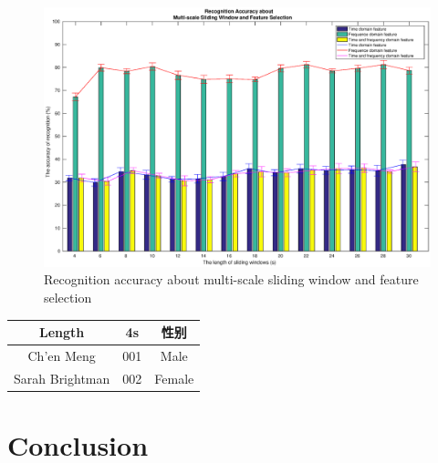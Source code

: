 \documentclass[runningheads,a4paper]{llncs}
\begin{document}
\begin{figure}
  \centering
  \includegraphics[width=18cm,angle=90]{17}
  \caption{Recognition accuracy about multi-scale sliding window and feature selection}
  \label{fig:sliding}
\end{figure}

\begin{tabular}{ccc}
  \toprule
  Length& 4s& 性别\\
  \midrule
  Ch'en Meng& 001& Male\\
  Sarah Brightman& 002& Female\\
  \bottomrule
  \end{tabular}
\section{Conclusion}
\end{document}
